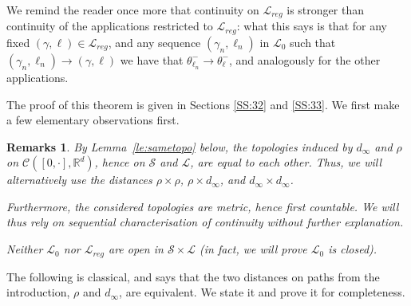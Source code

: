 \documentclass[11pt]{article}
\newtheorem{remarks}[theorem]{Remarks}
\begin{document}
We remind the reader once more that continuity on $\mathscr{L}_{reg}$ is stronger than continuity of the applications restricted to $\mathscr{L}_{reg}$: what this says is that for any fixed $(\gamma,\ell) \in \mathscr{L}_{reg}$, and any sequence $(\gamma_n,\ell_n) $ in $\mathscr{L}_{0}$ such that $(\gamma_n , \ell_n) \to (\gamma, \ell)$ we have that $\theta^-_{\ell_n} \to \theta^-_{\ell}$, and analogously for the other applications.

The proof of this theorem is given in Sections \ref{SS:32} and \ref{SS:33}. We first make a few elementary observations first. 

\begin{remarks}
    By Lemma~\ref{le:sametopo} below, the topologies induced by $d_\infty$ and $\rho$ on $\mathcal{C}([0,\cdot],\mathbb{R}^d)$, hence on $\mathscr{S}$ and $\mathscr{L}$, are equal to each other. Thus, we will alternatively use the distances $\rho\times \rho$, $\rho\times d_\infty$,  and $d_\infty\times d_\infty$.

    Furthermore, the considered topologies are metric, hence first countable. We will thus rely on sequential characterisation of continuity
     without further explanation.

    Neither $\mathscr{L}_{0}$ nor $\mathscr{L}_{reg}$ are open in $\mathscr{S}\times \mathscr{L}$ (in fact, we will prove $\mathscr{L}_{0}$ is closed).

\end{remarks}

The following is classical, and says that the two distances on paths from the introduction, $\rho$ and $d_\infty$, are equivalent. We state it and prove it for completeness.
\end{document}

